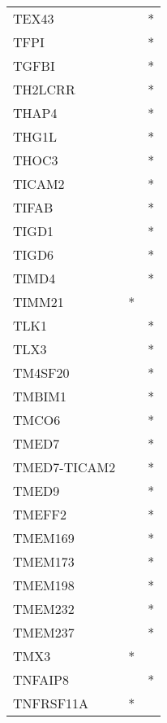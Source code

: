 \begin{longtable}{lcc}
TEX43           &                &          * \\
TFPI            &                &          * \\
TGFBI           &                &          * \\
TH2LCRR         &                &          * \\
THAP4           &                &          * \\
THG1L           &                &          * \\
THOC3           &                &          * \\
TICAM2          &                &          * \\
TIFAB           &                &          * \\
TIGD1           &                &          * \\
TIGD6           &                &          * \\
TIMD4           &                &          * \\
TIMM21          &              * &            \\
TLK1            &                &          * \\
TLX3            &                &          * \\
TM4SF20         &                &          * \\
TMBIM1          &                &          * \\
TMCO6           &                &          * \\
TMED7           &                &          * \\
TMED7-TICAM2    &                &          * \\
TMED9           &                &          * \\
TMEFF2          &                &          * \\
TMEM169         &                &          * \\
TMEM173         &                &          * \\
TMEM198         &                &          * \\
TMEM232         &                &          * \\
TMEM237         &                &          * \\
TMX3            &              * &            \\
TNFAIP8         &                &          * \\
TNFRSF11A       &              * &            \\

\end{longtable}
